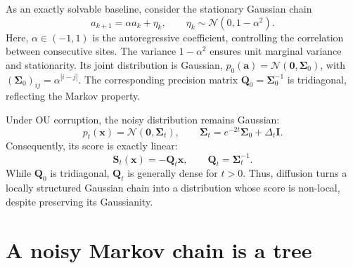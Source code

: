 \documentclass{article}
\begin{document}


As an exactly solvable baseline, consider the stationary Gaussian chain
\begin{equation}
    a_{k+1}=\alpha a_k+\eta_k,
    \qquad \eta_k\sim\mathcal N(0,1-\alpha^2).
\end{equation}
Here, $\alpha\in(-1,1)$ is the autoregressive coefficient,
controlling the correlation between consecutive sites.
The variance $1-\alpha^2$ ensures unit marginal
variance and stationarity.
Its joint distribution is Gaussian,
$p_0(\mathbf a)=\mathcal N(\mathbf 0,\boldsymbol\Sigma_0)$,
with $(\boldsymbol\Sigma_0)_{ij}=\alpha^{|i-j|}$.
The corresponding precision matrix
$\mathbf Q_0=\boldsymbol\Sigma_0^{-1}$ is tridiagonal,
reflecting the Markov property.

Under OU corruption, the noisy distribution remains Gaussian:
\begin{equation}
    p_t(\mathbf x)=\mathcal N(\mathbf 0,\boldsymbol\Sigma_t),
    \qquad
    \boldsymbol\Sigma_t
    =e^{-2t}\boldsymbol\Sigma_0+\Delta_t\mathbf I.
\end{equation}
Consequently, its score is exactly linear:
\begin{equation}
    \mathbf S_t(\mathbf x)
    =-\mathbf Q_t\mathbf x,
    \qquad \mathbf Q_t=\boldsymbol\Sigma_t^{-1}.
\end{equation}
While $\mathbf Q_0$ is tridiagonal, $\mathbf Q_t$ is generally dense
for $t>0$. Thus, diffusion turns a locally structured Gaussian
chain into a distribution whose score is non-local, despite
preserving its Gaussianity.
\section{A noisy Markov chain is a tree}
\label{sec:tree}

\begin{figure}[t]
  \centering
  
  \caption{}
  \label{fig:factor-graph}
\end{figure}
\end{document}
